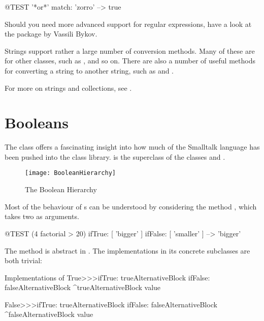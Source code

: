 \documentclass[a4paper,10pt,twoside]{book}
\begin{document}
\begin{code}{@TEST}
'*or*' match: 'zorro' --> true
\end{code}

Should you need more advanced support for regular expressions, have a look at the package by Vassili Bykov.

Strings support rather a large number of conversion methods. Many of these are  for other classes, such as ,  and so on.  There are also a number of useful methods for converting a string to another string, such as  and .

For more on strings and collections, see .


\section{Booleans}

The class  offers a fascinating insight into how much of the Smalltalk language has been pushed into the class library.  is the  superclass of the  classes  and .

\begin{figure}[ht]
	{\centerline {\texttt{[image: BooleanHierarchy]}}}
\caption{The Boolean Hierarchy }
\end{figure}

Most of the behaviour of s can be understood by considering the method , which takes two  as arguments.

\begin{code}{@TEST}
(4 factorial > 20) ifTrue: [ 'bigger' ] ifFalse: [ 'smaller' ] --> 'bigger'
\end{code}

The method is abstract in .
The implementations in its concrete subclasses are both trivial:

\begin{method}{Implementations of }
True>>>ifTrue: trueAlternativeBlock ifFalse: falseAlternativeBlock 
    ^trueAlternativeBlock value

False>>>ifTrue: trueAlternativeBlock ifFalse: falseAlternativeBlock 
    ^falseAlternativeBlock value
\end{method}
\end{document}
